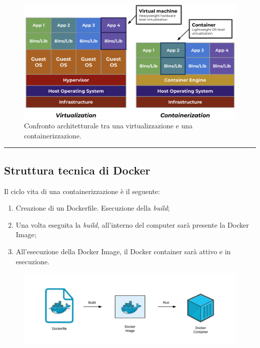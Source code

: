 \documentclass[a4paper]{article}
\newcommand{\longline}{\noindent\rule{\textwidth}{0.4pt}}
\begin{document}
	\noindent
	\begin{figure}[!htp]
		\centering
		\includegraphics[width=\textwidth]{img/docker/docker-1.png}
		\caption{Confronto architetturale tra una virtualizzazione e una containerizzazione.}
	\end{figure}
	
	\longline
	
	\subsection{Struttura tecnica di Docker}
	
	Il ciclo vita di una containerizzazione è il seguente:
	\begin{enumerate}
		\item Creazione di un Dockerfile. Esecuzione della \emph{build};
		
		\item Una volta eseguita la \emph{build}, all'interno del computer sarà presente la Docker Image;
		
		\item All'esecuzione della Docker Image, il Docker container sarà attivo e in esecuzione.
	\end{enumerate}
	
	\begin{figure}[!htp]
		\centering
		\includegraphics[width=\textwidth]{img/docker/docker-2.png}
	\end{figure}\newpage
	
\end{document}
